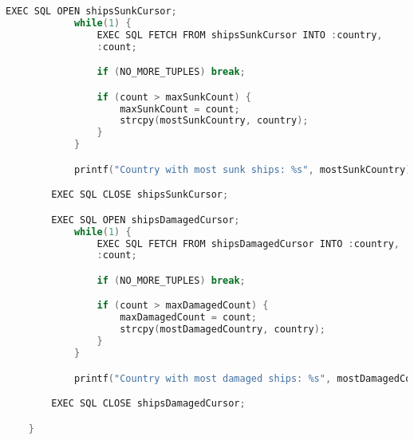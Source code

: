\documentclass[12pt]{article}
\begin{document}
\begin{enumerate}[1.]
\begin{enumerate}[a)]
\begin{lstlisting}[language=c]
        EXEC SQL OPEN shipsSunkCursor;
            while(1) {
                EXEC SQL FETCH FROM shipsSunkCursor INTO :country,
                :count;

                if (NO_MORE_TUPLES) break;

                if (count > maxSunkCount) {
                    maxSunkCount = count;
                    strcpy(mostSunkCountry, country);
                }
            }

            printf("Country with most sunk ships: %s", mostSunkCountry);

        EXEC SQL CLOSE shipsSunkCursor;

        EXEC SQL OPEN shipsDamagedCursor;
            while(1) {
                EXEC SQL FETCH FROM shipsDamagedCursor INTO :country,
                :count;

                if (NO_MORE_TUPLES) break;

                if (count > maxDamagedCount) {
                    maxDamagedCount = count;
                    strcpy(mostDamagedCountry, country);
                }
            }

            printf("Country with most damaged ships: %s", mostDamagedCountry);

        EXEC SQL CLOSE shipsDamagedCursor;

    }
    \end{lstlisting}


    \end{enumerate}
\end{enumerate}
\end{document}
